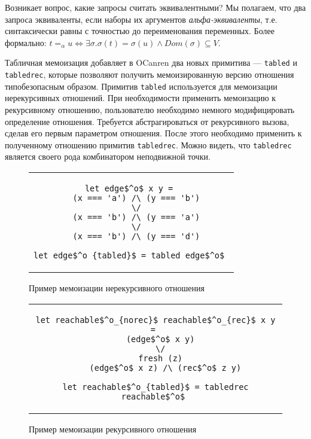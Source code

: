 Возникает вопрос, какие запросы считать эквивалентными?
Мы полагаем, что два запроса эквиваленты,
если наборы их аргументов \emph{альфа-эквиваленты},
т.е. синтаксически равны с точностью до переименования переменных.
Более формально: 
$t =_{\alpha} u \Leftrightarrow \exists \sigma. \sigma(t) = \sigma(u) \wedge Dom(\sigma) \subseteq V$.

Табличная мемоизация добавляет в OCanren два новых примитива --- \texttt{tabled} и \texttt{tabledrec},
которые позволяют получить мемоизированную версию отношения типобезопасным образом.
Примитив \texttt{tabled} используется для мемоизации нерекурсивных отношений.
При необходимости применить мемоизацию к рекурсивному отношению, 
пользователю необходимо немного модифицировать определение отношения.
Требуется абстрагироваться от рекурсивного вызова,
сделав его первым параметром отношения.
После этого необходимо применить к полученному отношению примитив \texttt{tabledrec}.
Можно видеть, что \texttt{tabledrec} является своего рода комбинатором неподвижной точки.

\begin{figure}[thp]
\begin{center}
\begin{tabular}{c}
\begin{lstlisting}
let edge$^o$ x y = 
  (x === 'a') /\ (y === 'b')
  \/
  (x === 'b') /\ (y === 'a')
  \/
  (x === 'b') /\ (y === 'd')

let edge$^o_{tabled}$ = tabled edge$^o$ 
\end{lstlisting}
\end{tabular}
\end{center}
\caption{Пример мемоизации нерекурсивного отношения}
\label{lst:tabled}
\end{figure}

\begin{figure}[thp]
\begin{center}
\begin{tabular}{c}
\begin{lstlisting}
let reachable$^o_{norec}$ reachable$^o_{rec}$ x y = 
  (edge$^o$ x y)
  \/
  fresh (z)
    (edge$^o$ x z) /\ (rec$^o$ z y)
    
let reachable$^o_{tabled}$ = tabledrec reachable$^o$ 
\end{lstlisting}
\end{tabular}
\end{center}
\caption{Пример мемоизации рекурсивного отношения}
\label{lst:tabledrec}
\end{figure}

